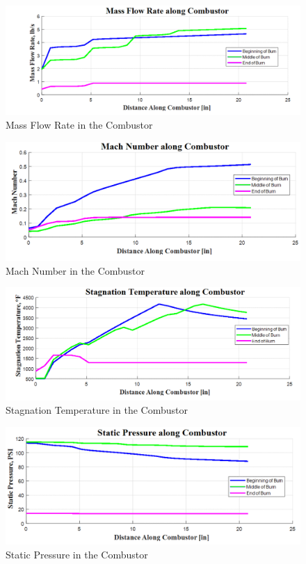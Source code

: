 \begin{figure}[H]
\centering
\includegraphics[width=1\textwidth] {Combustor_Figures/Massflow.png}
\caption{Mass Flow Rate in the Combustor}
\label{fig:massflow}
\end{figure}



\begin{figure}[H]
\centering
\includegraphics[width=1\textwidth] {Combustor_Figures/Mach.png}
\caption{Mach Number in the Combustor}
\label{fig:mach}
\end{figure}

\begin{figure}[H]
\centering
\includegraphics[width=1\textwidth] {Combustor_Figures/Temperature.png}
\caption{Stagnation Temperature in the Combustor}
\label{fig:temperature}
\end{figure}

\begin{figure}[H]
\centering
\includegraphics[width=1\textwidth] {Combustor_Figures/Pressure.png}
\caption{Static Pressure in the Combustor}
\label{fig:pressure}
\end{figure}

